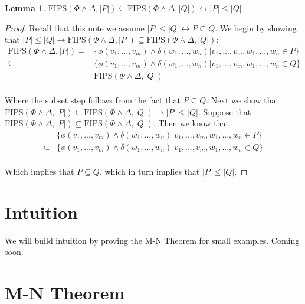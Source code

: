 \documentclass[12pt]{article}
\theoremstyle{definition}
\newtheorem{lemma}{Lemma}
\theoremstyle{remark}
\newcommand{\fips}{\text{FIPS}}
\begin{document}
\begin{lemma}
  \label{lem:fips-subset}
  $\fips(\Phi \land \Delta, |P|) \subseteq \fips(\Phi \land \Delta, |Q|) \leftrightarrow |P| \leq |Q|$
\end{lemma}
\begin{proof}
  Recall that this note we assume $|P| \leq |Q| \leftrightarrow P \subseteq Q$.  We begin by showing that $|P| \leq |Q| \rightarrow \fips(\Phi \land \Delta, |P|) \subseteq \fips(\Phi \land \Delta, |Q|)$:
  \begin{align*}
    \fips(\Phi \land \Delta, |P|) = &\{\phi(v_1,...,v_m) \land \delta(w_1,...,w_n) | v_1,...,v_m,w_1,...,w_n \in P\}\\
    \subseteq &\{\phi(v_1,...,v_m) \land \delta(w_1,...,w_n) | v_1,...,v_m,w_1,...,w_n \in Q\}\\
    = &\fips(\Phi \land \Delta, |Q|)\\
  \end{align*}

  Where the subset step follows from the fact that $P \subseteq Q$.  Next we show that $\fips(\Phi \land \Delta, |P|) \subseteq \fips(\Phi \land \Delta, |Q|) \rightarrow |P| \leq |Q|$.  Suppose that $\fips(\Phi \land \Delta, |P|) \subseteq \fips(\Phi \land \Delta, |Q|)$.  Then we know that 
  \begin{align*}
    &\{\phi(v_1,...,v_m) \land \delta(w_1,...,w_n) | v_1,...,v_m,w_1,...,w_n \in P\}\\
    \subseteq &\{\phi(v_1,...,v_m) \land \delta(w_1,...,w_n) | v_1,...,v_m,w_1,...,w_n \in Q\}\\
  \end{align*}

  Which implies that $P \subseteq Q$, which in turn implies that $|P| \leq |Q|$.

\end{proof}


\section{Intuition}
We will build intuition by proving the M-N Theorem for small examples.  Coming soon.


\section{M-N Theorem}
\end{document}
